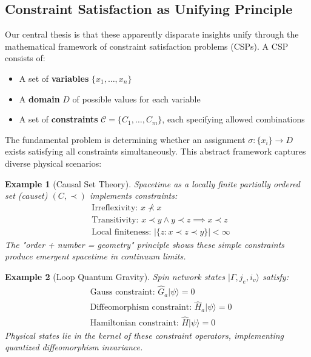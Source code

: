 \documentclass[11pt,a4paper]{article}
\newtheorem{example}{Example}[section]
\theoremstyle{remark}
\theoremstyle{definition}
\begin{document}
\subsection{Constraint Satisfaction as Unifying Principle}

Our central thesis is that these apparently disparate insights unify through the mathematical framework of constraint satisfaction problems (CSPs). A CSP consists of:
\begin{itemize}
\item A set of \textbf{variables} $\{x_1, \ldots, x_n\}$
\item A \textbf{domain} $D$ of possible values for each variable
\item A set of \textbf{constraints} $\mathcal{C} = \{C_1, \ldots, C_m\}$, each specifying allowed combinations
\end{itemize}

The fundamental problem is determining whether an assignment $\sigma: \{x_i\} \to D$ exists satisfying all constraints simultaneously. This abstract framework captures diverse physical scenarios:

\begin{example}[Causal Set Theory]
Spacetime as a locally finite partially ordered set (causet) $(C, \prec)$ implements constraints:
\begin{align}
&\text{Irreflexivity: } x \not\prec x \\
&\text{Transitivity: } x \prec y \wedge y \prec z \implies x \prec z \\
&\text{Local finiteness: } |\{z : x \prec z \prec y\}| < \infty
\end{align}
The "order + number = geometry" principle shows these simple constraints produce emergent spacetime in continuum limits.
\end{example}

\begin{example}[Loop Quantum Gravity]
Spin network states $|\Gamma, j_e, i_v\rangle$ satisfy:
\begin{align}
&\text{Gauss constraint: } \hat{G}_a |\psi\rangle = 0 \\
&\text{Diffeomorphism constraint: } \hat{H}_a |\psi\rangle = 0 \\
&\text{Hamiltonian constraint: } \hat{H} |\psi\rangle = 0
\end{align}
Physical states lie in the kernel of these constraint operators, implementing quantized diffeomorphism invariance.
\end{example}
\end{document}
